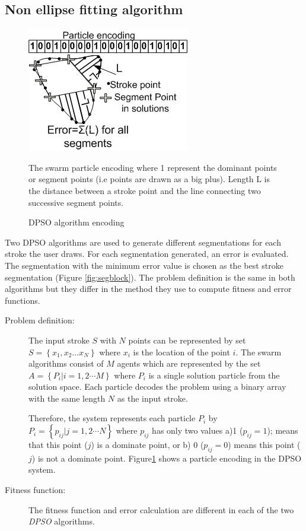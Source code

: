 \documentclass[preprint,10pt,5p,twocolumn]{elsarticle}
\begin{document}
\subsection{Non ellipse fitting algorithm}
\label{subsubsec:Discreteparticleswarmalgorithm}
\begin{figure}
	\centering
	 \includegraphics[scale=0.7]{images/pso1.jpg}			
	\caption{DPSO algorithm encoding} The swarm particle encoding where 1 represent the dominant points or segment points (i.e points are drawn as a big plus). Length L is the distance between a stroke point and the line connecting two successive segment points. %
	\label{fig:pso1}
\end{figure}
Two DPSO algorithms are used to generate different segmentations for each stroke the user draws. For each segmentation generated, an error is evaluated. The segmentation with the minimum error value is chosen as the best stroke segmentation (Figure \ref{fig:segblock}). The problem definition is the same in both algorithms but they differ in the method they use to compute fitness and error functions. 
\begin{description}
	\item[ Problem definition:] The input stroke $S$  with $N$ points can be represented by set $S = \left\{ {x_1 ,x_2  \ldots x_N }\right\}$ where $x_i$ is the location of the point $i$. The swarm algorithms consist of $M$ agents which are represented by the set $A = \left\{ {P_i \left| {i = 1,2 \cdots M} \right.} \right\}$ where $P_i$ is a single solution particle from the solution space. Each particle decodes the problem using a binary array with the same length $N$ as the input stroke.  

Therefore, the system represents each particle $P_i$ by $P_i = \left\{ {p_{ij} \left| {j = 1,2 \cdots N} \right.} \right\}$ where $p_{ij}$ has only two values a)1 ($p_{ij}=1$); means that this point ($j$) is a dominate point, or b) 0 ($p_{ij}=0$) means this point ($j$) is not a dominate point. Figure\ref{fig:pso1} shows a particle encoding in the DPSO system. 

	\item[Fitness function:] The fitness function and error calculation are different in each of the two \textit{DPSO} algorithms. 
	\end{description}
\end{document}
